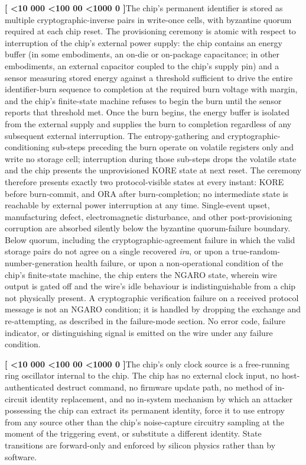 \documentclass[12pt,letterpaper]{article}
\newcounter{para}
\newcommand{\padzero}{%
  \ifnum\value{para}<10 000\else%
  \ifnum\value{para}<100 00\else%
  \ifnum\value{para}<1000 0\else%
  \fi\fi\fi}
\newcommand{\para}{%
  \refstepcounter{para}\noindent\textbf{[\padzero\arabic{para}]}\hspace{0.5em}\ignorespaces}
\begin{document}
\para The chip's permanent identifier is stored as multiple cryptographic-inverse pairs in write-once cells, with byzantine quorum required at each chip reset. The provisioning ceremony is atomic with respect to interruption of the chip's external power supply: the chip contains an energy buffer (in some embodiments, an on-die or on-package capacitance; in other embodiments, an external capacitor coupled to the chip's supply pin) and a sensor measuring stored energy against a threshold sufficient to drive the entire identifier-burn sequence to completion at the required burn voltage with margin, and the chip's finite-state machine refuses to begin the burn until the sensor reports that threshold met. Once the burn begins, the energy buffer is isolated from the external supply and supplies the burn to completion regardless of any subsequent external interruption. The entropy-gathering and cryptographic-conditioning sub-steps preceding the burn operate on volatile registers only and write no storage cell; interruption during those sub-steps drops the volatile state and the chip presents the unprovisioned KORE state at next reset. The ceremony therefore presents exactly two protocol-visible states at every instant: KORE before burn-commit, and ORA after burn-completion; no intermediate state is reachable by external power interruption at any time. Single-event upset, manufacturing defect, electromagnetic disturbance, and other post-provisioning corruption are absorbed silently below the byzantine quorum-failure boundary. Below quorum, including the cryptographic-agreement failure in which the valid storage pairs do not agree on a single recovered \emph{ira}, or upon a true-random-number-generation health failure, or upon a non-operational condition of the chip's finite-state machine, the chip enters the NGARO state, wherein wire output is gated off and the wire's idle behaviour is indistinguishable from a chip not physically present. A cryptographic verification failure on a received protocol message is not an NGARO condition; it is handled by dropping the exchange and re-attempting, as described in the failure-mode section. No error code, failure indicator, or distinguishing signal is emitted on the wire under any failure condition.

\para The chip's only clock source is a free-running ring oscillator internal to the chip. The chip has no external clock input, no host-authenticated destruct command, no firmware update path, no method of in-circuit identity replacement, and no in-system mechanism by which an attacker possessing the chip can extract its permanent identity, force it to use entropy from any source other than the chip's noise-capture circuitry sampling at the moment of the triggering event, or substitute a different identity. State transitions are forward-only and enforced by silicon physics rather than by software.
\end{document}
